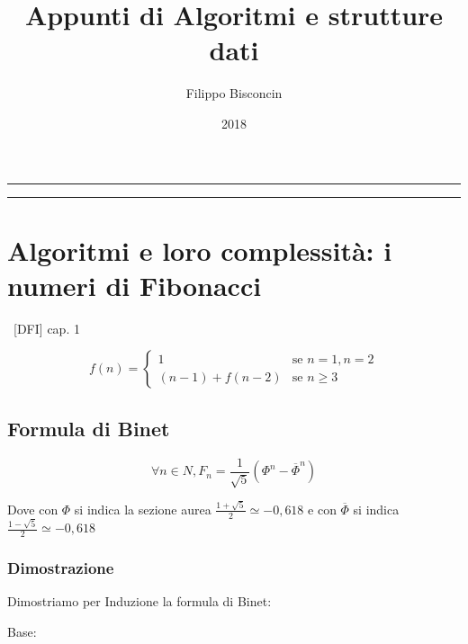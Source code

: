 \documentclass{article}
\title{Appunti di Algoritmi e strutture dati}
\author{Filippo Bisconcin}
\date{2018}
\begin{document}
\begin{titlepage}
\maketitle
\end{titlepage}

\begin{center}\rule{0.5\linewidth}{\linethickness}\end{center}

\tableofcontents

\begin{center}\rule{0.5\linewidth}{\linethickness}\end{center}

\section{Algoritmi e loro complessità: i numeri di Fibonacci}

{~{[}DFI{]} cap. 1}

\begin{equation}
f(n) = 
\begin{cases}
1 & \mbox{se } n=1,n=2 \\ 
(n-1)+f(n-2) & \mbox{se } n\geq3 
\end{cases}
\end{equation}

\subsection{Formula di Binet}

\begin{equation}
\forall n \in N, F_n = \frac{1}{\sqrt{5}}(\Phi^n-\overline{\Phi}^n)
\end{equation}

Dove con $\Phi$ si indica la sezione aurea $\frac{1+\sqrt{5}}{2} \simeq -0,618$ e con $\overline{\Phi}$ si indica $\frac{1-\sqrt{5}}{2} \simeq -0,618$

\subsubsection{Dimostrazione}

{Dimostriamo per Induzione la formula di Binet:}

{Base:}
\end{document}
